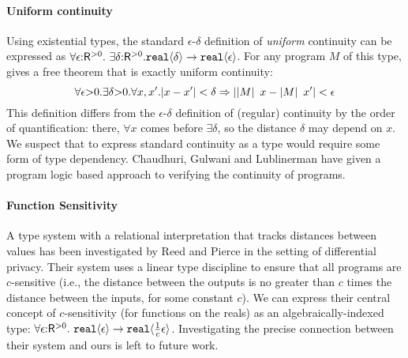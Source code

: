 \paragraph{Uniform continuity}
Using %
existential types, %
the standard $\epsilon$-$\delta$ definition of
\emph{uniform} continuity can be expressed as %
$  \forall \epsilon \mathord: \mathsf{R}^{>0}.\ \exists \delta\mathord: \mathsf{R}^{>0}.\\ \textup{\texttt{real}}\langle \delta \rangle \to \textup{\texttt{real}}\langle \epsilon \rangle$.
For any program $M$ of this type, %
 gives a free theorem that is exactly 
uniform continuity:
\begin{displaymath}
  \forall \epsilon \mathord> 0. \exists \delta \mathord> 0. \forall x,x'. \lvert x - x' \rvert < \delta \Rightarrow \lvert \left| M\right|\ x - \left| M\right|\ x' \rvert < \epsilon
\end{displaymath}
This definition differs from the $\epsilon$-$\delta$ definition of
(regular) continuity by the order of quantification:
there, $\forall x$ comes before $\exists \delta$, so the distance
$\delta$ may depend on %
$x$. We suspect that to express standard continuity as a type would
require some form of type dependency. Chaudhuri, Gulwani and
Lublinerman \cite{chaudhuri10continuity} have given a program logic
based approach to verifying the continuity of programs.

\paragraph{Function Sensitivity}
A type system with a relational interpretation that tracks distances
between values has %
been investigated by Reed and Pierce \cite{reed10distance} in the
setting of differential privacy. Their system uses a linear type
discipline to ensure that all programs are $c$-sensitive (i.e., the
distance between the outputs is no greater than $c$ times the
distance between the inputs, for some constant $c$). We can express
their central concept of $c$-sensitivity (for functions on the reals)
as an algebraically-indexed type: $\forall
\epsilon\mathord:\mathsf{R}^{>0}.\ \textup{\texttt{real}}\langle \epsilon \rangle \to
\textup{\texttt{real}}\langle \frac{1}{c}\epsilon \rangle$. Investigating the precise
connection between their system and ours is left to future work.


